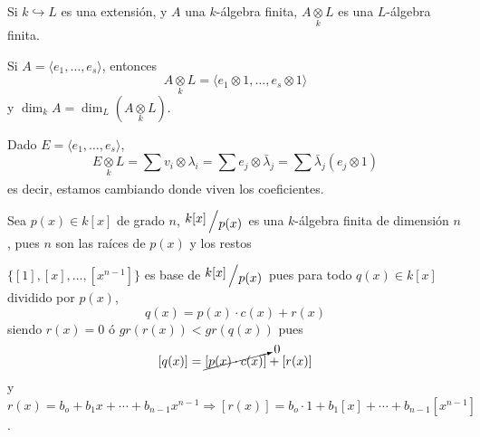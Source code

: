     \begin{obs}
        Si $k \hookrightarrow L$ es una extensi\'on, y $A$ una $k$-\'algebra finita, $A \underset{k}{\otimes} L$ es una $L$-\'algebra finita.
    \end{obs}
    \begin{dem}
        Si $A = \langle e_1, \ldots, e_s\rangle$, entonces 
        $$A \underset{k}{\otimes} L = \langle e_1 \otimes 1,\ldots, e_s\otimes 1 \rangle$$
        y $\dim_k A = \dim_L (A\underset{k}{\otimes} L)$.
    \end{dem}
    \begin{obs}
        Dado $E=\langle e_1, \ldots, e_s\rangle$, 
        $$E \underset{k}{\otimes} L = \sum_{} v_i \otimes \lambda _i = \sum e_j \otimes \bar \lambda_j = \sum \bar \lambda_j(e_j \otimes 1)$$
        es decir, estamos cambiando donde viven los coeficientes. 
    \end{obs}
    \begin{ejem}
        [fundamental] Sea $p(x)\in k[x]$ de grado $n$, $\modulo{k[x]}{p(x)}$ es una $k$-\'algebra finita de dimensi\'on $n$, pues $n$ son las ra\'ices de $p(x)$ y los restos 
    \end{ejem}
    \begin{dem}
        $\{[1],[x],\ldots, [x^{n-1}]\}$ es base de $\modulo{k[x]}{p(x)}$ pues para todo $q(x) \in k[x]$ dividido por $p(x)$, 
        $$q(x) = p(x) \cdot c(x) + r(x)$$
        siendo $r(x) = 0$ \'o $gr(r(x)) < gr(q(x))$ pues
        $$[q(x)]=\cancelto{0}{[p(x) \cdot c(x)]} + [r(x)]$$
        y $r(x) = b_o + b_1x+ \cdots+ b_{n-1} x^{n-1} \Rightarrow [r(x)]=b_o \cdot 1 + b_1 [x] + \cdots+ b_{n-1} [x^{n-1}]$.
    \end{dem}
